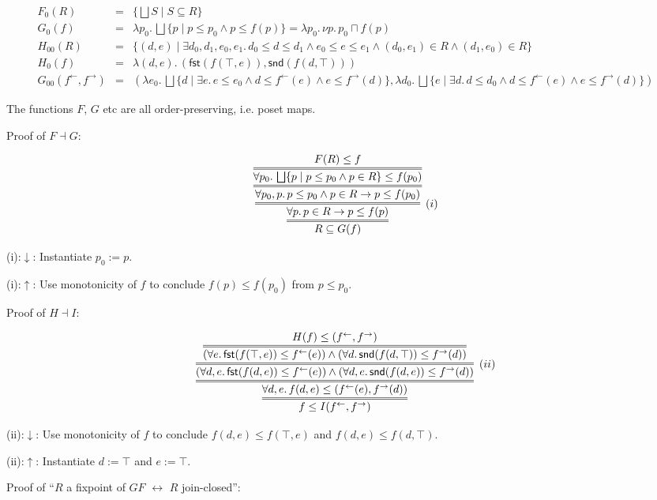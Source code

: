 \documentclass[9pt]{article}
\newcommand{\ff}{{f^{\rightarrow}}}
\newcommand{\fb}{{f^{\leftarrow}}}
\newcommand{\bigjoin}{\bigsqcup}
\newcommand{\meet}{\sqcap}
\newcommand{\con}{\wedge}
\newcommand{\imp}{\to}
\newcommand{\equ}{\leftrightarrow}
\newcommand{\fst}{\mathsf{fst}}
\newcommand{\snd}{\mathsf{snd}}
\begin{document}
\begin{eqnarray*}
  F_0(R) & = & \{\bigjoin S \mid S \subseteq R\} \\
  G_0(f) & = & \lambda p_0.\, \bigjoin \{ p \mid p \leq p_0 \con p \leq f(p) \}
               = \lambda p_0.\, \nu p.\, p_0 \meet f(p) \\
  H_{00}(R) & = & \{ (d,e) \mid \exists d_0,d_1,e_0,e_1.\,
        d_0 \leq d \leq d_1 \con e_0 \leq e \leq e_1
           \con (d_0,e_1) \in R \con (d_1,e_0) \in R\} \\
  H_0 (f) & = & \lambda (d,e).\, (\fst(f(\top,e)), \snd(f(d,\top))) \\
  G_{00} (\fb,\ff) & = & (\lambda e_0.\, \bigjoin \{d \mid \exists e.\, e \leq e_0 \con d \leq \fb(e) \con e \leq \ff(d) \},
                         \lambda d_0.\, \bigjoin \{e \mid \exists d.\, d \leq d_0 \con d \leq \fb(e) \con e \leq \ff(d) \})
\end{eqnarray*}


The functions $F$, $G$ etc are all order-preserving, i.e. poset maps. 

Proof of $F \dashv G$:

\[
\infer={R \subseteq G(f)}{
  \infer=[(i)]{\forall p.\, p \in R \imp p \leq f(p)}{
    \infer={\forall p_0,p.\, p \leq p_0 \con p \in R \imp p \leq f(p_0)}{
      \infer={\forall p_0.\, \bigjoin \{p \mid p \leq p_0 \con p \in R\} \leq f(p_0)}{
        F(R) \leq f
      }
    }
  }
}  
\]

(i):$\downarrow$: Instantiate $p_0 := p$.

(i):$\uparrow$: Use monotonicity of $f$ to conclude $f(p) \leq f(p_0)$ from
$p \leq p_0$.

\bigskip


Proof of $H \dashv I$:

\[
\infer={f \leq I(\fb,\ff)}{
  \infer={\forall d,e.\, f(d,e) \leq (\fb(e),\ff(d))}{
    \infer=[(ii)]{(\forall d,e.\, \fst(f(d,e)) \leq \fb(e))
        \con (\forall d,e.\, \snd(f(d,e)) \leq \ff(d))}{
      \infer={(\forall e.\, \fst(f(\top,e)) \leq \fb(e))
        \con (\forall d.\, \snd(f(d,\top)) \leq \ff(d))}{
       H(f) \leq (\fb,\ff) 
      }
    }  
  }
}  
\]  

(ii):$\downarrow$: Use monotonicity of $f$ to conclude
$f(d,e) \leq f(\top,e)$ and $f(d,e) \leq f(d, \top)$.

(ii):$\uparrow$: Instantiate $d := \top$ and $e := \top$.

\bigskip

Proof of ``$R$ a fixpoint of $GF$ $\equ$ $R$ join-closed'':
\end{document}
